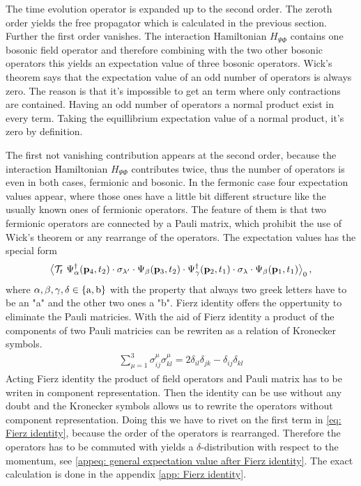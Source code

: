 The time evolution operator is expanded up to the second order.
The zeroth order yields the free propagator which is calculated in the previous section.
Further the first order vanishes.
The interaction Hamiltonian $H_{\Psi\Phi}$ contains one bosonic field operator and therefore combining with the two other bosonic operators this yields an expectation value of three bosonic operators.
Wick's theorem says that the expectation value of an odd number of operators is always zero.
The reason is that it's impossible to get an term where only contractions are contained.
Having an odd number of operators a normal product exist in every term.
Taking the equillibrium expectation value of a normal product, it's zero by definition.

The first not vanishing contribution appears at the second order, because the interaction Hamiltonian $H_{\Psi\Phi}$ contributes twice, thus the number of operators is even in both cases, fermionic and bosonic.
In the fermonic case four expectation values appear, where those ones have a little bit different structure like the usually known ones of fermionic operators.
The feature of them is that two fermionic operators are connected by a Pauli matrix, which prohibit the use of Wick's theorem or any rearrange of the operators.
The expectation values has the special form
%
\begin{align}
	\expval{\mathcal{T}_{t}\ \Psi_{\alpha}^{\dag}(\vb{p}_{4},t_{2}) \cdot \sigma_{\lambda'} \cdot \Psi_{\beta}(\vb{p}_{3},t_{2}) \cdot \Psi_{\gamma}^{\dag}(\vb{p}_{2},t_{1}) \cdot \sigma_{\lambda} \cdot \Psi_{\beta}(\vb{p}_{1},t_{1})}_{0},
	\label{eq: structure of fermionic expval}
\end{align}
%
where $\alpha,\beta,\gamma,\delta \in \{\mathrm{a},\mathrm{b}\}$ with the property that always two greek letters have to be an "a" and the other two ones a "b".
Fierz identity offers the oppertunity to eliminate the Pauli matricies.
With the aid of Fierz identity a product of the components of two Pauli matricies can be rewriten as a relation of Kronecker symbols.
%
\begin{align}
	\sum\limits_{\mu = 1}^{3} \sigma_{ij}^{\mu} \sigma_{kl}^{\mu} = 2 \delta_{il} \delta_{jk} - \delta_{ij} \delta_{kl}
	\label{eq: Fierz identity}
\end{align}
%
Acting Fierz identity the product of field operators and Pauli matrix has to be writen in component representation.
Then the identity can be use without any doubt and the Kronecker symbols allows us to rewrite the operators without component representation.
Doing this we have to rivet on the first term in \eqref{eq: Fierz identity}, because the order of the operators is rearranged.
Therefore the operators has to be commuted  with yields a $\delta$-distribution with respect to the momentum, see \eqref{appeq: general expectation value after Fierz identity}.
The exact calculation is done in the appendix \ref{app: Fierz identity}.

